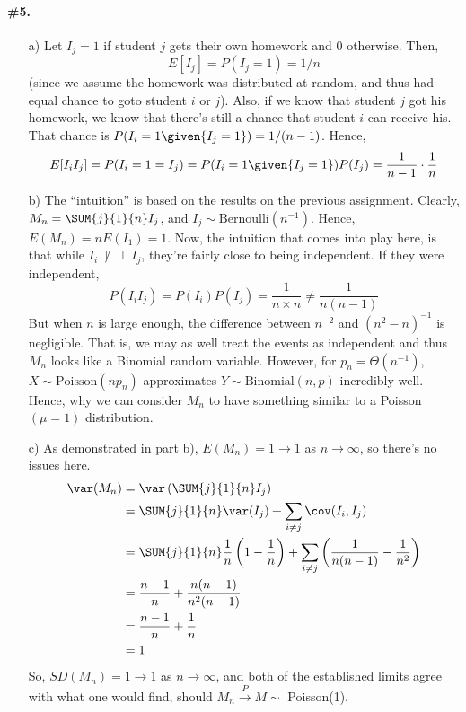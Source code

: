 \documentclass[12pt,titlepage]{article}
\newcommand{\orth}{\perp\!\!\!\perp}
\begin{document}
\paragraph{\#5.}
\begin{enumerate}
\item[a)] Let $I_j =1$ if student $j$ gets their own homework and 0 otherwise. Then, \[E[I_j] = P(I_j = 1) = 1/n\] (since we assume the homework was distributed at random, and thus had equal chance to goto student $i$ or $j$). Also, if we know that student $j$ got his homework, we know that there's still a chance that student $i$ can receive his. That chance is $P(I_i = 1 \given{I_j = 1}) = 1/(n-1)$. Hence,
\[
E[I_i I_j] = P(I_i=1=I_j) = P(I_i = 1 \given{I_j=1})P(I_j) = \frac{1}{n-1} \cdot \frac{1}{n}
\]
\item[b)] The ``intuition'' is based on the results on the previous assignment. Clearly, $M_n = \SUM{j}{1}{n} I_j$, and $I_j \sim \text{Bernoulli}(n^{-1})$. Hence, $E(M_n) = n E(I_1) = 1$. Now, the intuition that comes into play here, is that while $I_i \not\orth I_j$, they're fairly close to being independent. If they were independent, 
\[
P(I_i I_j) = P(I_i)P(I_j) = \frac{1}{n \times n} \neq \frac{1}{n(n-1)}
\]
But when $n$ is large enough, the difference between $n^{-2}$ and $(n^2 -n)^{-1}$ is negligible. That is, we may as well treat the events as independent and thus $M_n$ looks like a Binomial random variable. However, for $p_n = \Theta(n^{-1})$, $X \sim \text{Poisson}(n p_n)$ approximates $Y \sim \text{Binomial}(n,p)$ incredibly well. Hence, why we can consider $M_n$ to have something similar to a Poisson$(\mu=1)$ distribution. 
\item[c)] As demonstrated in part b), $E(M_n) = 1 \to 1$ as $n\to \infty$, so there's no issues here.
\begin{align*}
\var(M_n) &= \var\left(\SUM{j}{1}{n}I_j\right) \\
&=\SUM{j}{1}{n} \var(I_j) + \sum_{i\neq j} \cov(I_i,I_j) \\
&= \SUM{j}{1}{n} \frac{1}{n}\left(1 - \frac{1}{n}\right) + \sum_{i \neq j} \left(\frac{1}{n(n-1)} - \frac{1}{n^2}\right) \\
&= \frac{n-1}{n} + \frac{n(n-1)}{n^2(n-1)} \\
&= \frac{n-1}{n} +\frac{1}{n} \\
&= 1
\end{align*}
So, $SD(M_n) = 1 \to 1$ as $n \to \infty$, and both of the established limits agree with what one would find, should $M_n \xrightarrow{P} M \sim$ Poisson(1).
\end{enumerate}
\end{document}
